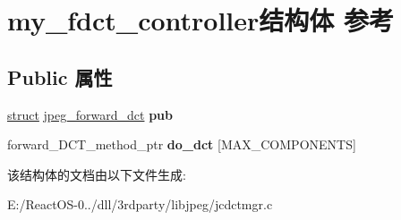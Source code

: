 \hypertarget{structmy__fdct__controller}{}\section{my\+\_\+fdct\+\_\+controller结构体 参考}
\label{structmy__fdct__controller}
\subsection*{Public 属性}
\begin{DoxyCompactItemize}
\item 
\mbox{\label{structmy__fdct__controller_a233a1343c6fc838dcad3d3dce3a658a0}} 
\hyperlink{interfacestruct}{struct} \hyperlink{structjpeg__forward__dct}{jpeg\+\_\+forward\+\_\+dct} {\bfseries pub}
\item 
\mbox{\label{structmy__fdct__controller_a4708c82c14bc7a348520824d38f66f06}} 
forward\+\_\+\+D\+C\+T\+\_\+method\+\_\+ptr {\bfseries do\+\_\+dct} \mbox{[}M\+A\+X\+\_\+\+C\+O\+M\+P\+O\+N\+E\+N\+TS\mbox{]}
\end{DoxyCompactItemize}


该结构体的文档由以下文件生成\+:\begin{DoxyCompactItemize}
\item 
E\+:/\+React\+O\+S-\/0../dll/3rdparty/libjpeg/jcdctmgr.\+c\end{DoxyCompactItemize}
